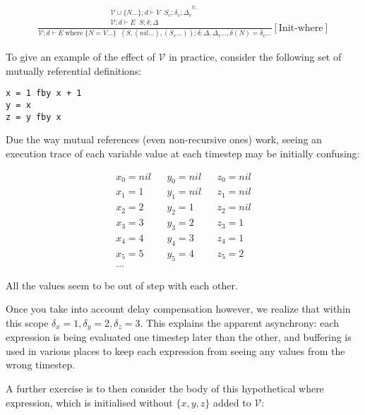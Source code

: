 \documentclass{scrartcl}
\DeclareMathOperator{\where}{where}
\DeclareMathOperator{\initrel}{\overset{init}{\Rightarrow}}
\begin{document}
    \begin{align*}
    \frac{
        \begin{matrix}
        \overline{\mathcal{V} \cup \{N...\}; d \vdash V \initrel S_v; \delta_v; \Delta_v}^{V...} \\
        \mathcal{V}; d \vdash E \initrel S; \delta; \Delta
        \end{matrix}
    }{
        \mathcal{V}; d \vdash E \where \{ N=V... \} \initrel (S, (nil...), (S_v...)); \delta; \Delta, \Delta_v..., \delta(N)=\delta_v...
    }[\text{Init-where}]
    \end{align*}
    
    To give an example of the effect of $\mathcal{V}$ in practice, consider the following set of mutually referential definitions:
    
    \begin{lstlisting}
x = 1 fby x + 1
y = x
z = y fby x
    \end{lstlisting}
    
    Due the way mutual references (even non-recursive ones) work, seeing an execution trace of each variable value at each timestep may be initially confusing:
    
    \begin{align*}
    x_0 = nil && y_0 = nil && z_0 = nil \\
    x_1 = 1 && y_1 = nil && z_1 = nil \\
    x_2 = 2 && y_2 = 1 && z_2 = nil \\
    x_3 = 3 && y_3 = 2 && z_3 = 1 \\
    x_4 = 4 && y_4 = 3 && z_4 = 1 \\
    x_5 = 5 && y_5 = 4 && z_5 = 2 \\
    ...
    \end{align*}
    
    All the values seem to be out of step with each other.
    
    Once you take into account delay compensation however, we realize that within this scope $\delta_x = 1, \delta_y = 2, \delta_z = 3$. This explains the apparent asynchrony: each expression is being evaluated one timestep later than the other, and buffering is used in various places to keep each expression from seeing any values from the wrong timestep.
    
    A further exercise is to then consider the body of this hypothetical where expression, which is initialised without $\{x, y, z\}$ added to $\mathcal{V}$:
    
\end{document}
